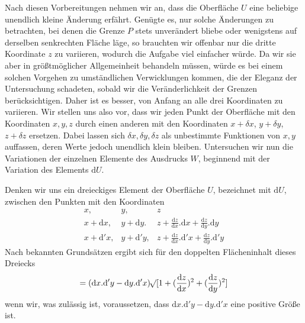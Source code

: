 Nach diesen Vorbereitungen nehmen wir an, dass die Oberfläche $U$ eine beliebige unendlich kleine Änderung erfährt. Genügte es, nur solche Änderungen zu betrachten, bei denen die Grenze $P$ stets unverändert bliebe oder wenigstens auf derselben senkrechten Fläche läge, so brauchten wir offenbar nur die dritte Koordinate $z$ zu variieren, wodurch die Aufgabe viel einfacher würde. Da wir sie aber in größtmöglicher Allgemeinheit behandeln müssen, würde es bei einem solchen Vorgehen zu umständlichen Verwicklungen kommen, die der Eleganz der Untersuchung schadeten, sobald wir die Veränderlichkeit der Grenzen berücksichtigen. Daher ist es besser, von Anfang an alle drei Koordinaten zu variieren. Wir stellen uns also vor, dass wir jeden Punkt der Oberfläche mit den Koordinaten $x,y,z$ durch einen anderen mit den Koordinaten $x+\delta x$, $y+\delta y$, $z+\delta z$ ersetzen. Dabei lassen sich $\delta x,\delta y,\delta z$ als unbestimmte Funktionen von $x,y$ auffassen, deren Werte jedoch unendlich klein bleiben. Untersuchen wir nun die Variationen der einzelnen Elemente des Ausdrucks $W$, beginnend mit der Variation des Elements $\mathrm{d}U$.

Denken wir uns ein dreieckiges Element der Oberfläche $U$, bezeichnet mit $\mathrm{d}U$, zwischen den Punkten mit den Koordinaten
\[
\begin{array}{lll}
x,&y,&z\\
x+\mathrm{d}x,&y+\mathrm{d}y.&z+\frac{\mathrm{d}z}{\mathrm{d}x}.\mathrm{d}x+\frac{\mathrm{d}z}{\mathrm{d}y}.\mathrm{d}y\\
x+\mathrm{d}'x,&y+\mathrm{d}'y,&z+\frac{\mathrm{d}z}{\mathrm{d}x}.\mathrm{d}'x+\frac{\mathrm{d}z}{\mathrm{d}y}.\mathrm{d}'y
\end{array}
\]
Nach bekannten Grundsätzen ergibt sich für den doppelten Flächeninhalt dieses Dreiecks
\[
=(\mathrm{d}x.\mathrm{d}'y-\mathrm{d}y.\mathrm{d}'x)\mathord{{}^{}\!\surd}[1+(\frac{\mathrm{d}z}{\mathrm{d}x})^2+(\frac{\mathrm{d}z}{\mathrm{d}y})^2]
\]
wenn wir, was zulässig ist, voraussetzen, dass $\mathrm{d}x.\mathrm{d}'y-\mathrm{d}y.\mathrm{d}'x$ eine positive Größe ist.

